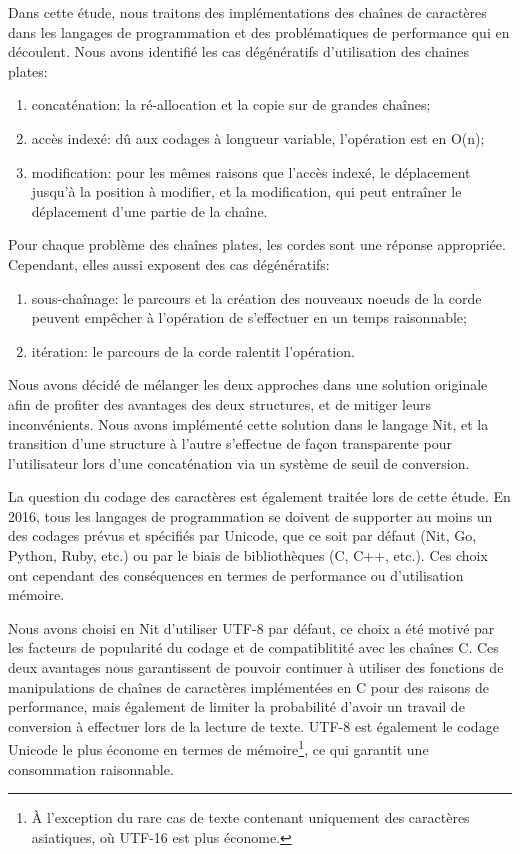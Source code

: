 \begin{conclusion}

Dans cette étude, nous traitons des implémentations des chaînes de caractères dans les langages de programmation et des problématiques de performance qui en découlent.
Nous avons identifié les cas dégénératifs d'utilisation des chaines plates:

\begin{enumerate}
	\item concaténation: la ré-allocation et la copie sur de grandes chaînes;
	\item accès indexé: dû aux codages à longueur variable, l'opération est en O(n);
	\item modification: pour les mêmes raisons que l'accès indexé, le déplacement jusqu'à la position à modifier, et
		la modification, qui peut entraîner le déplacement d'une partie de la chaîne.
\end{enumerate}

Pour chaque problème des chaînes plates, les cordes sont une réponse appropriée.
Cependant, elles aussi exposent des cas dégénératifs:

\begin{enumerate}
	\item sous-chaînage: le parcours et la création des nouveaux noeuds de la corde peuvent empêcher à l'opération de s'effectuer en un temps raisonnable;
	\item itération: le parcours de la corde ralentit l'opération.
\end{enumerate}

Nous avons décidé de mélanger les deux approches dans une solution originale afin de profiter des avantages des
deux structures, et de mitiger leurs inconvénients.
Nous avons implémenté cette solution dans le langage Nit, et la transition d'une structure à l'autre s'effectue
de façon transparente pour l'utilisateur lors d'une concaténation via un système de seuil de conversion.

La question du codage des caractères est également traitée lors de cette étude.
En 2016, tous les langages de programmation se doivent de supporter au moins un des codages prévus et spécifiés
par Unicode, que ce soit par défaut (Nit, Go, Python, Ruby, etc.) ou par le biais de bibliothèques (C, C++, etc.).
Ces choix ont cependant des conséquences en termes de performance ou d'utilisation mémoire.

Nous avons choisi en Nit d'utiliser UTF-8 par défaut, ce choix a été motivé par les facteurs de popularité
du codage et de compatiblitité avec les chaînes C.
Ces deux avantages nous garantissent de pouvoir continuer à utiliser des fonctions de manipulations de chaînes
de caractères implémentées en C pour des raisons de performance, mais également de limiter la probabilité
d'avoir un travail de conversion à effectuer lors de la lecture de texte.
UTF-8 est également le codage Unicode le plus économe en termes de mémoire\footnote{À l'exception du rare cas
de texte contenant uniquement des caractères asiatiques, où UTF-16 est plus économe.}, ce qui garantit
une consommation raisonnable.


\end{conclusion}
